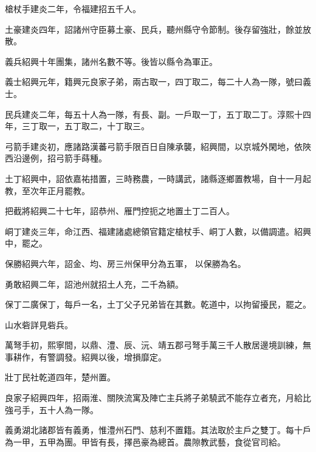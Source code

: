 \begin{pinyinscope}
 槍杖手建炎二年，令福建招五千人。



 土豪建炎四年，詔諸州守臣募土豪、民兵，聽州縣守令節制。後存留強壯，餘並放散。



 義兵紹興十年團集，諸州名數不等。後皆以縣令為軍正。



 義士紹興元年，籍興元良家子弟，兩古取一，四丁取二，每二十人為一隊，號曰義士。



 民兵建炎二年，每五十人為一隊，有長、副。一戶取一丁，五丁取二丁。淳熙十四年，三丁取一，五丁取二，十丁取三。



 弓箭手建炎初，應諸路漢蕃弓箭手限百日自陳承襲，紹興間，以京城外閑地，依陜西沿邊例，招弓箭手蒔種。



 土丁紹興中，詔依嘉祐措置，三時務農，一時講武，諸縣逐鄉置教場，自十一月起教，至次年正月罷教。



 把截將紹興二十七年，詔恭州、雁門控扼之地置土丁二百人。



 峒丁建炎三年，命江西、福建諸處總領官籍定槍杖手、峒丁人數，以備調遣。紹興中，罷之。



 保勝紹興六年，詔金、均、房三州保甲分為五軍，
 以保勝為名。



 勇敢紹興二年，詔池州就招土人充，二千為額。



 保丁二廣保丁，每戶一名，土丁父子兄弟皆在其數。乾道中，以拘留擾民，罷之。



 山水砦詳見砦兵。



 萬弩手初，熙寧間，以鼎、澧、辰、沅、靖五郡弓弩手萬三千人散居邊境訓練，無事耕作，有警調發。紹興以後，增損靡定。



 壯丁民社乾道四年，楚州置。



 良家子紹興四年，招兩淮、關陜流寓及陣亡主兵將子弟驍武不能存立者充，月給比強弓手，五十人為一隊。



 義勇湖北諸郡皆有義勇，惟澧州石門、慈利不置籍。其法取於主戶之雙丁。每十戶為一甲，五甲為團。甲皆有長，擇邑豪為總首。農隙教武藝，食從官司給。




\end{pinyinscope}
